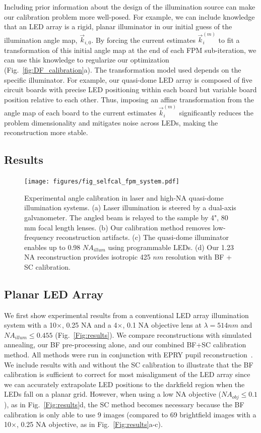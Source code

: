 Including prior information about the design of the illumination source can make our calibration problem more well-posed. For example, we can include knowledge that an LED array is a rigid, planar illuminator in our initial guess of the illumination angle map, $\vec{k}_{i,0}$. By forcing the current estimates $\vec{k}_i^{(m)}$ to fit a transformation of this initial angle map at the end of each FPM sub-iteration, we can use this knowledge to regularize our optimization (Fig.~\ref{fig:DF_calibration}a). The transformation model used depends on the specific illuminator. For example, our quasi-dome LED array is composed of five circuit boards with precise LED positioning within each board but variable board position relative to each other. Thus, imposing an affine transformation from the angle map of each board to the current estimates $\vec{k}_i^{(m)}$ significantly reduces the problem dimensionality and mitigates noise across LEDs, making the reconstruction more stable.

\subsection{Results}

\begin{figure} [t]
	\centering
	\texttt{[image: figures/fig\_selfcal\_fpm\_system.pdf]}
	\caption{Experimental angle calibration in laser and high-NA quasi-dome illumination systems. (a) Laser illumination is steered by a dual-axis galvanometer. The angled beam is relayed to the sample by 4", 80 mm focal length lenses. (b) Our calibration method removes low-frequency reconstruction artifacts. (c) The quasi-dome illuminator enables up to 0.98 $NA_{illum}$ using programmable LEDs. (d) Our 1.23 NA reconstruction provides isotropic 425 $nm$ resolution with BF + SC calibration.
		}
	\label{Fig:laserDome}
\end{figure}

\subsection{Planar LED Array}
We first show experimental results from a conventional LED array illumination system with a 10$\times$, 0.25 NA and a 4$\times$, 0.1 NA objective lens at $\lambda = 514 nm$ and $NA_{illum} \leq 0.455$ (Fig.~\ref{Fig:results}). We compare reconstructions with simulated annealing, our BF pre-processing alone, and our combined BF+SC calibration method. All methods were run in conjunction with EPRY pupil reconstruction~\cite{Ou:14}. We include results with and without the SC calibration to illustrate that the BF calibration is sufficient to correct for most misalignment of the LED array since we can accurately extrapolate LED positions to the darkfield region when the LEDs fall on a planar grid. However, when using a low NA objective ($NA_{obj} \leq 0.1$), as in Fig.~\ref{Fig:results}d, the SC method becomes necessary because the BF calibration is only able to use 9 images (compared to 69 brightfield images with a 10$\times$, 0.25 NA objective, as in Fig.~\ref{Fig:results}a-c). 


